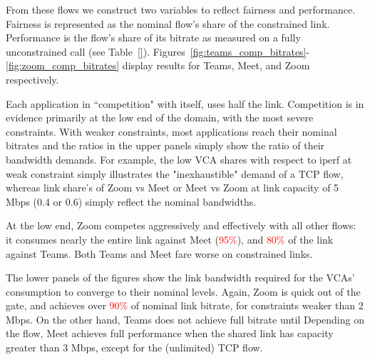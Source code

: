 From these flows we construct two variables
  to reflect fairness and performance.
Fairness is represented 
  as the nominal flow's share of the constrained link.
Performance is the flow's share of its bitrate 
 as measured on a fully unconstrained call (see Table~\ref{}).
Figures~\ref{fig:teams_comp_bitrates}-\ref{fig:zoom_comp_bitrates}
  display results for Teams, Meet, and Zoom respectively.

Each application in ``competition" with itself, uses half the link.
Competition is in evidence primarily at the low end of the domain,
  with the most severe constraints.
With weaker constraints, most applications reach their nominal bitrates
  and the ratios in the upper panels simply show the ratio of their bandwidth demands.
For example, 
  the low VCA shares with respect to iperf at weak constraint
  simply illustrates the "inexhaustible" demand of a TCP flow,
  whereas link share's of Zoom vs Meet or Meet vs Zoom 
  at link capacity of 5 Mbps (0.4 or 0.6) simply 
  reflect the nominal bandwidths.

  
At the low end, Zoom competes
  aggressively and effectively with all other flows:
  it consumes nearly the entire link against Meet (\textcolor{red}{95\%}), 
  and \textcolor{red}{80\%} of the link against Teams.
Both Teams and Meet fare worse on constrained links.
  
The lower panels of the figures show
  the link bandwidth required for the VCAs' consumption
  to converge to their nominal levels.
Again, Zoom is quick out of the gate, and 
  achieves over \textcolor{red}{90\%} of nominal link bitrate,
  for constraints weaker than 2 Mbps.
On the other hand, Teams does not achieve full bitrate
  until 
Depending on the flow, Meet achieves full 
  performance when the shared link has capacity greater than 3 Mbps, 
  except for the (unlimited) TCP flow.
  





